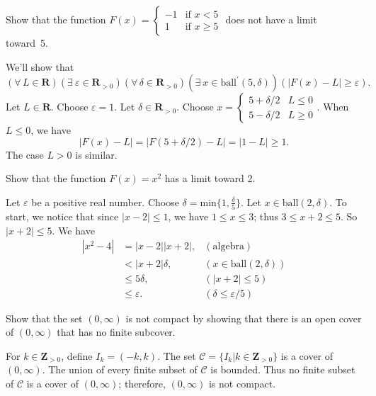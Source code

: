 \documentclass[12pt,fleqn,answers]{exam}
\newcommand{\reals}{\mathbf{R}}
\newcommand{\ball}{\mathrm{ball}}
\newcommand{\integers}{\mathbf{Z}}
\let\oldforall\forall
\renewcommand{\forall}{\oldforall \, }
\let\oldexist\exists
\renewcommand{\exists}{\oldexist \: }
\begin{document}
\begin{questions}
\question  Show that the function
\(\displaystyle
  F(x) = \begin{cases} -1 & \mbox{if } x < 5 \\
                        1 & \mbox{if } x \geq 5
         \end{cases}
\)
does not have a limit \mbox{toward 5.}

\begin{solution} We'll show that
\begin{equation*}
  \left(\forall L \in \reals \right)
  \left(\exists \varepsilon \in \reals_{>0} \right)
  \left(\forall \delta \in \reals_{>0} \right)
  \left(\exists x \in \ball^\prime(5,\delta) \right)
  \left( \left|F(x) - L \right| \geq \varepsilon \right).
\end{equation*}
Let $L \in \reals$. Choose $\varepsilon = 1$. Let 
$\delta \in \reals_{>0}$. Choose $x = \begin{cases}
  5+\delta/2 & L \leq 0 \\ 5 -\delta/2 & L \geq 0 \end{cases}$.
When $L \leq 0$, we have
\begin{equation*}
  |F(x) - L| = |F(5+\delta/2) - L| = |1 - L| \geq 1.
\end{equation*}
The case $L > 0$ is similar.

\end{solution}

\question   Show that the function \(F(x) = x^2\) has a limit
toward 2.
\begin{solution}
Let \(\varepsilon\) be a positive real number. Choose
\(\delta = \mbox{min} \{1, \frac{\delta}{5} \}\).  Let  \(x \in
\ball(2,\delta)\). To start, we notice that since $|x-2| \leq 1$, we have $ 1 \leq x \leq 3$;
thus $3 \leq x+2 \leq 5$. So $|x+2| \leq 5$. We have
\begin{align*}
  | x^2 - 4 | &= |x - 2| |x + 2|, & (\mbox{algebra}) \\
              &< |x + 2| \delta, & (x \in \ball(2,\delta))\\
              &\leq 5 \delta, &(|x+2| \leq 5) \\
              &\leq \varepsilon.  &(\delta \leq \varepsilon/5)
\end{align*}
\end{solution}

\question   Show that the set \((0,\infty)\) is not compact by 
showing that there is an open cover of \((0,\infty)\) that has no
finite subcover.

\begin{solution}
 For \(k \in \integers_{>0}\), define \(I_k = (-k,k)\).
The set \(\mathcal{C} = \{I_k | k \in \integers_{>0}\}\) is a cover of 
\((0,\infty)\).  The union of every finite subset of \(\mathcal{C}\)
is bounded. Thus no finite subset of \(\mathcal{C}\) is a cover of
\((0,\infty)\); therefore, \((0,\infty)\) is not compact.
\end{solution}


\end{questions}
\end{document}
